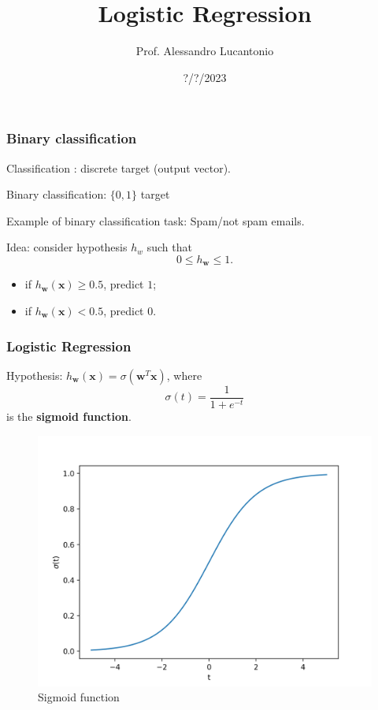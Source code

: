 \documentclass{beamer}
\title{Logistic Regression}
\author{Prof. Alessandro Lucantonio}
\institute{Aarhus University - Department of Mechanical and Production Engineering}
\date{?/?/2023}
\begin{document}
	\frame{\titlepage}
	
	\begin{frame}
		\frametitle{Binary classification}
		Classification : discrete target (output vector).
		
		Binary classification: $\{0,1\}$ target
		
		\vspace{5mm}
		Example of binary classification task: Spam/not spam emails.
		
		\vspace{5mm}
		Idea: consider hypothesis $h_w$ such that
		\begin{equation*}
			0 \leq h_{\bm{w}} \leq 1.
		\end{equation*}

		\begin{itemize}
			\item if $h_{\bm{w}}(\bm{x}) \geq 0.5$, predict $1$;
			\item if $h_{\bm{w}}(\bm{x}) < 0.5$, predict $0$.
		\end{itemize}
	\end{frame}

	\begin{frame}
		\frametitle{Logistic Regression}
		Hypothesis: $h_{\bm{w}}(\bm{x}) = \sigma(\bm{w}^T\bm{x})$, where
		\begin{equation*}
			\sigma(t) = \frac{1}{1+e^{-t}}
		\end{equation*}
		is the \textbf{sigmoid function}.
		
		\begin{figure}
			\centering
			\includegraphics[scale=0.45]{images/sigmoid}
			\caption{Sigmoid function}
		\end{figure}
		
	\end{frame}
\end{document}
